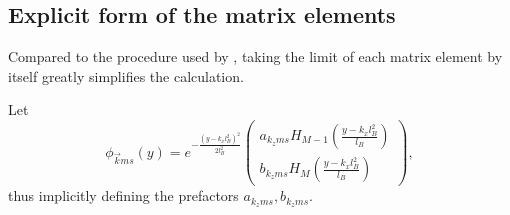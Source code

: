 \subsection{Explicit form of the matrix elements}
Compared to the procedure used by \citeauthor{arjonaFingerprintsConformalAnomaly2019}\cite{arjonaFingerprintsConformalAnomaly2019}, taking the limit of each matrix element by itself greatly simplifies the calculation.

Let
\begin{equation}
  \label{eq:72}
  \phi _{\vec{k}ms}(y)
  = e^{-\frac{(y-k_xl_B^2)^2}{2 l_{B}^2}}
  \begin{pmatrix}
    a_{k_zms} H_{M-1} \left( \frac{y - k_xl_B^2}{l_B} \right)\\
    b_{k_zms} H_M \left( \frac{y - k_xl_B^2}{l_B} \right)
  \end{pmatrix},
\end{equation}
thus implicitly defining the prefactors $a_{k_z ms}, b_{k_z ms}$.



